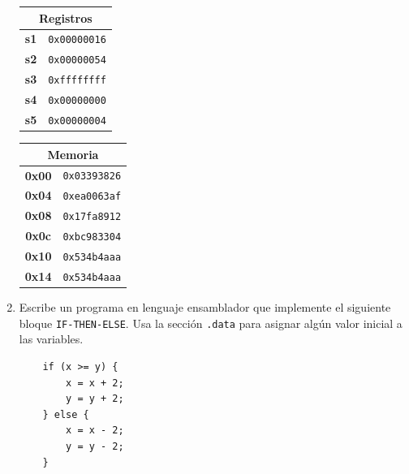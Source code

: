 \documentclass[letterpaper,12pt]{article}
\begin{document}
\begin{enumerate}
    \begin{table}[H]
        \centering
        \begin{minipage}[t]{0.45\textwidth}
            \centering
            \begin{tabular}{|c|c|}
                \hline
                \multicolumn{2}{|c|}{\textbf{Registros}} \\
                \hline
                \textbf{s1} & \texttt{0x00000016} \\
                \hline
                \textbf{s2} & \texttt{0x00000054} \\
                \hline
                \textbf{s3} & \texttt{0xffffffff} \\
                \hline
                \textbf{s4} & \texttt{0x00000000} \\
                \hline
                \textbf{s5} & \texttt{0x00000004} \\
                \hline
            \end{tabular}
        \end{minipage}
        \hfill
        \begin{minipage}[t]{0.45\textwidth}
            \centering
            \begin{tabular}{|c|c|}
                \hline
                \multicolumn{2}{|c|}{\textbf{Memoria}} \\
                \hline
                \textbf{0x00} & \texttt{0x03393826} \\
                \hline
                \textbf{0x04} & \texttt{0xea0063af} \\
                \hline
                \textbf{0x08} & \texttt{0x17fa8912} \\
                \hline
                \textbf{0x0c} & \texttt{0xbc983304} \\
                \hline
                \textbf{0x10} & \texttt{0x534b4aaa} \\
                \hline
                \textbf{0x14} & \texttt{0x534b4aaa} \\
                \hline
            \end{tabular}
        \end{minipage}
    \end{table}

    \vspace{0.5cm}

    \item Escribe un programa en lenguaje ensamblador que implemente el siguiente bloque \texttt{IF-THEN-ELSE}. Usa la sección \texttt{.data} para asignar algún valor inicial a las variables.
    \begin{verbatim}
    if (x >= y) {
        x = x + 2; 
        y = y + 2;
    } else {
        x = x - 2;
        y = y - 2;
    }
    \end{verbatim}


\end{enumerate}
\end{document}
